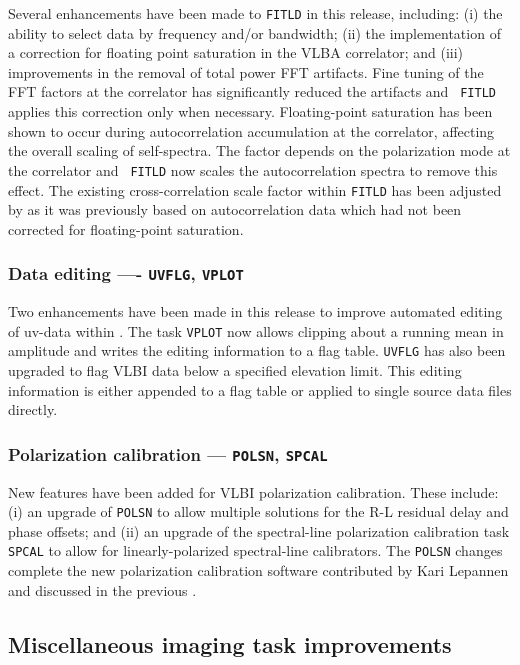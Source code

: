 Several enhancements have been made to {\tt FITLD} in this release,
including: (i) the ability to select data by frequency and/or
bandwidth; (ii) the implementation of a correction for floating point
saturation in the VLBA correlator; and (iii) improvements in the
removal of total power FFT artifacts.  Fine tuning of the FFT factors
at the correlator has significantly reduced the artifacts and {\tt
FITLD} applies this correction only when necessary.  Floating-point
saturation has been shown to occur during autocorrelation accumulation
at the correlator, affecting the overall scaling of self-spectra.  The
factor depends on the polarization mode at the correlator and {\tt
FITLD} now scales the autocorrelation spectra to remove this effect.
The existing cross-correlation scale factor within {\tt FITLD} has
been adjusted by as it was previously based on autocorrelation data
which had not been corrected for floating-point saturation.

\subsubsection{Data editing ---- {\tt UVFLG}, {\tt VPLOT}}

Two enhancements have been made in this release to improve automated
editing of uv-data within \hbox{\AIPS}.  The task {\tt VPLOT} now
allows clipping about a running mean in amplitude and writes the
editing information to a flag table.  {\tt UVFLG} has also been
upgraded to flag VLBI data below a specified elevation limit.  This
editing information is either appended to a flag table or applied to
single source data files directly.

\subsubsection{Polarization calibration --- {\tt POLSN}, {\tt SPCAL}}

New features have been added for VLBI polarization calibration. These
include: (i) an upgrade of {\tt POLSN} to allow multiple solutions for
the R-L residual delay and phase offsets; and (ii) an upgrade of the
spectral-line polarization calibration task {\tt SPCAL} to allow for
linearly-polarized spectral-line calibrators.  The {\tt POLSN} changes
complete the new polarization calibration software contributed by Kari
Lepannen and discussed in the previous \Aipsletter.

\subsection{Miscellaneous imaging task improvements}

